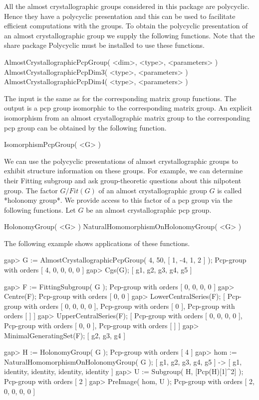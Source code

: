 
All the almost crystallographic groups considered in this package are
polycyclic. Hence they have a polycyclic presentation and this can be
used to facilitate efficient computations with the groups. To obtain the
polycyclic presentation of an almost crystallographic group we supply the
following functions. Note that the share package {\sf Polycyclic} must be 
installed to use these functions.

\> AlmostCrystallographicPcpGroup( <dim>, <type>, <parameters> )
\> AlmostCrystallographicPcpDim3( <type>, <parameters> )
\> AlmostCrystallographicPcpDim4( <type>, <parameters> )

The input is the same as for the corresponding matrix group functions.
The output is a pcp group isomorphic to the corresponding matrix group.
An explicit isomorphism from an almost crystallographic matrix group
to the corresponding pcp group can be obtained by the following function.

\> IsomorphismPcpGroup( <G> )

We can use the polycyclic presentations of almost crystallographic
groups to exhibit structure information on these groups. For example,
we can determine their Fitting subgroup and ask group-theoretic 
questions about this nilpotent group. The factor $G / Fit(G)$ of an
almost crystallographic group $G$ is called *holonomy group*. We 
provide access to this factor of a pcp group via the following 
functions. Let $G$ be an almost crystallographic pcp group.

\> HolonomyGroup( <G> )
\> NaturalHomomorphismOnHolonomyGroup( <G> )

The following example shows applications of these functions.

\beginexample
gap> G := AlmostCrystallographicPcpGroup( 4, 50, [ 1, -4, 1, 2 ] );
Pcp-group with orders [ 4, 0, 0, 0, 0 ]
gap> Cgs(G);
[ g1, g2, g3, g4, g5 ]

gap> F := FittingSubgroup( G );
Pcp-group with orders [ 0, 0, 0, 0 ]
gap> Centre(F);
Pcp-group with orders [ 0, 0 ]
gap> LowerCentralSeries(F);
[ Pcp-group with orders [ 0, 0, 0, 0 ], Pcp-group with orders [ 0 ], 
  Pcp-group with orders [  ] ]
gap> UpperCentralSeries(F);
[ Pcp-group with orders [ 0, 0, 0, 0 ], Pcp-group with orders [ 0, 0 ], 
  Pcp-group with orders [  ] ]
gap> MinimalGeneratingSet(F);
[ g2, g3, g4 ]

gap> H := HolonomyGroup( G );
Pcp-group with orders [ 4 ]
gap> hom := NaturalHomomorphismOnHolonomyGroup( G );
[ g1, g2, g3, g4, g5 ] -> [ g1, identity, identity, identity, identity ]
gap> U := Subgroup( H, [Pcp(H)[1]^2] );
Pcp-group with orders [ 2 ]
gap> PreImage( hom, U );
Pcp-group with orders [ 2, 0, 0, 0, 0 ]
\endexample

